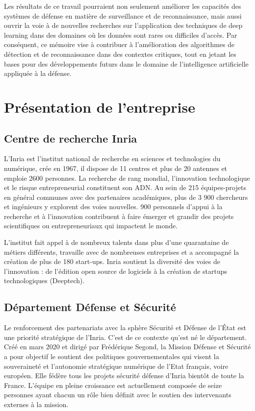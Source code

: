 Les résultats de ce travail pourraient non seulement améliorer les capacités des systèmes de défense en matière de surveillance et de reconnaissance, mais aussi ouvrir la voie à de nouvelles recherches sur l'application des techniques de deep learning dans des domaines où les données sont rares ou difficiles d'accès.
Par conséquent, ce mémoire vise à contribuer à l'amélioration des algorithmes de détection et de reconnaissance dans des contextes critiques, tout en jetant les bases pour des développements futurs dans le domaine de l'intelligence artificielle appliquée à la défense.


\newpage

\section{Présentation de l'entreprise}
\subsection{Centre de recherche Inria}
L’Inria est l’institut national de recherche en sciences et technologies du numérique, crée en 1967, il dispose de 11 centres et plus de 20 antennes et emploie 2600 personnes. La recherche de rang mondial, l’innovation technologique et le risque entrepreneurial constituent son ADN.
Au sein de 215 équipes-projets en général communes avec des partenaires académiques, plus de 3 900 chercheurs et ingénieurs y explorent des voies nouvelles. 900 personnels d’appui à la recherche et à l’innovation contribuent à faire émerger et grandir des projets scientifiques ou entrepreneuriaux qui impactent le monde.

L’institut fait appel à de nombreux talents dans plus d’une quarantaine de métiers différents, travaille avec de nombreuses entreprises et a accompagné la création de plus de 180 start-ups.
Inria soutient la diversité des voies de l’innovation : de l’édition open source de logiciels à la création de startups technologiques (Deeptech).


\subsection{Département Défense et Sécurité}
Le renforcement des partenariats avec la sphère Sécurité et Défense de l’État est une priorité stratégique de l’Inria. C’est de ce contexte qu’est né le département. Créé en mars 2020 et dirigé par Frédérique Segond, la Mission Défense et Sécurité a pour objectif le soutient des politiques gouvernementales qui visent la souveraineté et l’autonomie stratégique numérique de l’Etat français, voire européen. Elle fédère tous les projets sécurité défense d’Inria bientôt de toute la France.
L’équipe en pleine croissance est actuellement composée de seize personnes ayant chacun un rôle bien définit avec le soutien des intervenants externes à la mission.

